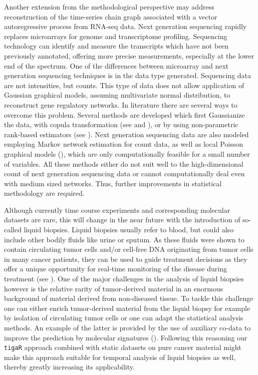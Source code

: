 \begin{conclusion}
Another extension from the methodological perspective may address reconstruction of the time-series chain graph associated with a vector autoregressive process from RNA-seq data. Next generation sequencing rapidly replaces microarrays for genome and transcriptome profiling. Sequencing technology can identify and measure the transcripts which have not been previously annotated, offering more precise measurements, especially at the lower end of the spectrum. One of the differences between microarray and next generation sequencing techniques is in the data type generated. Sequencing data are not intensities, but counts. This type of data does not allow application of Gaussian graphical models, assuming multivariate normal distribution, to reconstruct gene regulatory networks. In literature there are several ways to overcome this problem. Several methods are developed which first Gaussianize the data, with copula transformation (see \cite{Liu2009} and \cite{Dobra2011}), or by using non-parametric rank-based estimators (see \cite{Liu2012}). Next generation sequencing data are also modeled employing Markov network estimation for count data, as well as local Poisson graphical models (\cite{Allen2013}), which are only computationally feasible for a small number of variables. All these methods either do not suit well to the high-dimensional count of next generation sequencing data or cannot computationally deal even with medium sized networks. Thus, further improvements in statistical methodology are required.

Although currently time course experiments and corresponding molecular datasets are rare, this will change in the near future with the introduction of so-called liquid biopsies. Liquid biopsies usually refer to blood, but could also include other bodily fluids like urine or sputum. As these fluids were shown to contain circulating tumor cells and/or cell-free DNA originating from tumor cells in many cancer patients, they can be used to guide treatment decisions as they offer a unique opportunity for real-time monitoring of the disease during treatment (see \cite{Alix2013}). 
One of the major challenges in the analysis of liquid biopsies however is the relative rarity of tumor-derived material in an enormous background of material derived from non-diseased tissue. To tackle this challenge one can either enrich tumor-derived material from the liquid biopsy for example by isolation of circulating tumor cells or one can adapt the statistical analysis methods. An example of the latter is provided by the use of auxiliary co-data to improve the prediction by molecular signatures (\cite{Novianti2017}). Following this reasoning our {\tt tigaR} approach combined with static datasets on pure cancer material might make this approach suitable for temporal analysis of liquid biopsies as well, thereby greatly increasing its applicability.


\end{conclusion}
